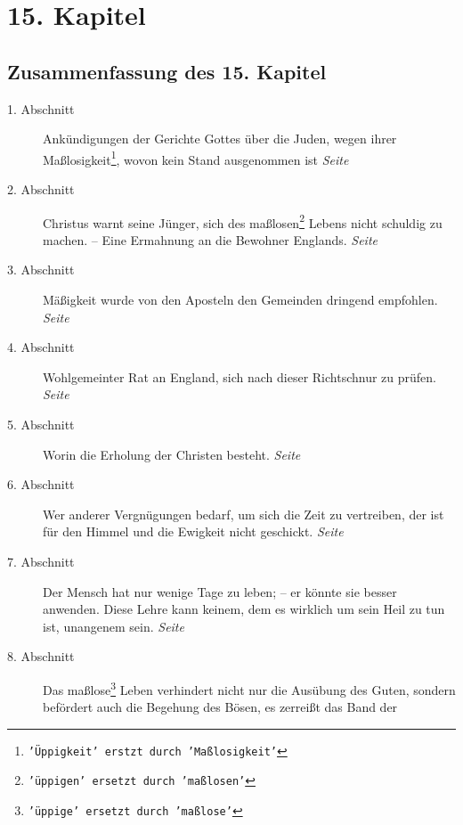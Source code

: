 
\chapter{15. Kapitel} \label{kap15}

\section{Zusammenfassung des 15. Kapitel}

\begin{description}
\item[1. Abschnitt] Ankündigungen der Gerichte Gottes über die Juden, wegen
ihrer Maßlosigkeit\footnote{\texttt{'Üppigkeit' erstzt durch 'Maßlosigkeit'}}, wovon
kein Stand ausgenommen ist
\dotfill \textit{Seite~\pageref{kap15_ab1}}\\
\item[2. Abschnitt] Christus warnt seine Jünger, sich des
maßlosen\footnote{\texttt{'üppigen' ersetzt durch 'maßlosen'}} Lebens nicht
schuldig zu machen. -- Eine Ermahnung an die Bewohner Englands.
\dotfill \textit{Seite~\pageref{kap15_ab2}}\\
\item[3. Abschnitt] Mäßigkeit wurde von den Aposteln den Gemeinden dringend
empfohlen.
\dotfill \textit{Seite~\pageref{kap15_ab3}}\\
\item[4. Abschnitt] Wohlgemeinter Rat an England, sich nach dieser Richtschnur
zu prüfen.
\dotfill \textit{Seite~\pageref{kap15_ab4}}\\
\item[5. Abschnitt] Worin die Erholung der Christen besteht.
\dotfill \textit{Seite~\pageref{kap15_ab5}}\\
\item[6. Abschnitt] Wer anderer Vergnügungen bedarf, um sich die Zeit zu
vertreiben, der ist für den Himmel und die Ewigkeit nicht geschickt.
\dotfill \textit{Seite~\pageref{kap15_ab6}}\\
\item[7. Abschnitt] Der Mensch hat nur wenige Tage zu leben; -- er könnte sie
besser anwenden. Diese Lehre kann keinem, dem es wirklich um sein Heil zu tun
ist, unangenem sein.
\dotfill \textit{Seite~\pageref{kap15_ab6}}\\
\item[8. Abschnitt] Das maßlose\footnote{\texttt{'üppige' ersetzt durch 'maßlose'}}
Leben verhindert nicht nur die Ausübung des
Guten, sondern befördert auch die Begehung des Bösen, es zerreißt das Band der

\end{description}
